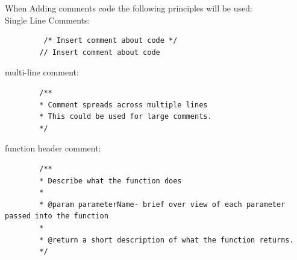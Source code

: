 \documentclass[hidelinks, 12pt, a4paper]{article}
\begin{document}
        When Adding comments code the following principles will be used:\\
        
        Single Line Comments:
        \begin{code}
         \begin{lstlisting}
         /* Insert comment about code */   
        // Insert comment about code
         \end{lstlisting}
       \end{code}
       
        multi-line comment:
         \begin{code}
    
        \begin{lstlisting}
        /** 
        * Comment spreads across multiple lines
        * This could be used for large comments.
        */
        \end{lstlisting}
            
        \end{code}               
 

        function header comment:
            
        \begin{code}
        
        \begin{lstlisting}
        /** 
        * Describe what the function does
        * 
        * @param parameterName- brief over view of each parameter passed into the function
        * 
        * @return a short description of what the function returns.
        */
        \end{lstlisting}
        \end{code}
\newpage
\end{document}
